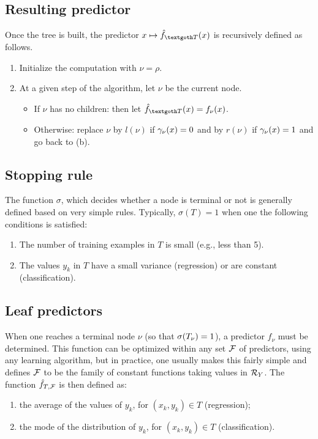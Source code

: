 \subsection{Resulting predictor}
Once the tree is built, the predictor $x \mapsto \hf_{\CTR}(x)$ is  recursively defined as follows.
 \begin{enumerate}[label=(\alph*)]
 \item Initialize the computation with $\nu=\rho$. 
 \item At a given step of the algorithm,  let $\nu$ be the current node.
 \begin{itemize}[wide=0.5cm]
 \item If $\nu$ has no children: then let $\hf_{\CTR} (x) = f_\nu(x)$.
 \item Otherwise: replace $\nu$ by $l(\nu)$ if $\gamma_\nu(x) = 0$ and by $r(\nu)$ if $\gamma_\nu(x) = 1$ and go back to (b). 
 \end{itemize}
\end{enumerate}


\subsection{Stopping rule}
 The function $\sigma$, which decides whether a node is terminal or not is generally defined based on very simple rules. Typically, $\sigma(T)=1$  when one the following conditions is satisfied:
\begin{enumerate}[label=$\bullet$]
\item The number of training examples in $T$  is small (e.g., less than 5).
\item The values $y_k$ in $T$ have a small variance (regression) or are constant (classification). 
\end{enumerate}

\subsection{Leaf predictors}
 When one reaches a terminal node $\nu$ (so that $\sigma(T_\nu) = 1$), a predictor $f_\nu$ must be determined. 
This function can be optimized within any set ${\mathcal F}$ of predictors, using any learning algorithm, but in practice, one usually makes this fairly simple and defines ${\mathcal F}$ to be the family of constant functions taking values in ${\mathcal R}_Y$. The function
 ${\hat{f}}_{T, {\mathcal F}}$ is then defined as:
\begin{enumerate}[label=$\bullet$]
\item the average of the values of $y_k$, for $(x_k, y_k)\in T$ (regression);
\item the mode of the distribution of $y_k$, for $(x_k, y_k)\in T$ (classification).
\end{enumerate}



